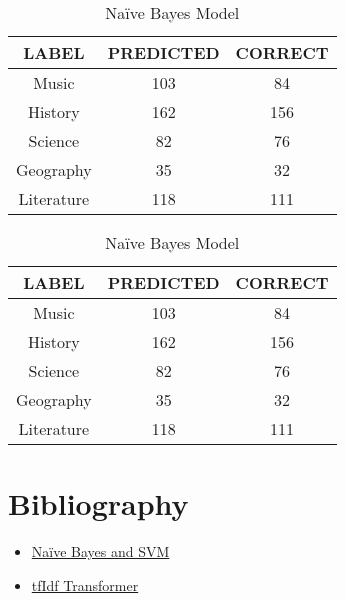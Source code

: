 \documentclass[11pt]{article}
\begin{document}
\begin{table}[!htb]
    \begin{minipage}{.5\linewidth}
      \centering
        \begin{tabular}{c|c|c}
           LABEL & PREDICTED & CORRECT\\\hline
Music & 103 & 84\\
History & 162 & 156\\
Science & 82 & 76\\
Geography & 35 & 32\\
Literature & 118 & 111\\\hline
        \end{tabular}
        \caption{SVM + TF-IDF Model}
    \end{minipage}%
    \begin{minipage}{.5\linewidth}
      \centering
        \begin{tabular}{c|c|c}
                LABEL & PREDICTED & CORRECT\\\hline
 Music & 103 & 84\\
History & 162 & 156\\
Science & 82 & 76\\
Geography & 35 & 32\\
Literature & 118 & 111\\\hline
        \end{tabular}
        \caption{Naïve Bayes Model}
    \end{minipage} 
\end{table}

\section{Bibliography}
\begin{itemize}
\item \href{https://kavita-ganesan.com/tfidftransformer-tfidfvectorizer-usage-differences/}{Naïve Bayes and SVM}
\item \href{https://kavita-ganesan.com/tfidftransformer-tfidfvectorizer-usage-differences/}{tfIdf Transformer}
\end{itemize}
\end{document}
